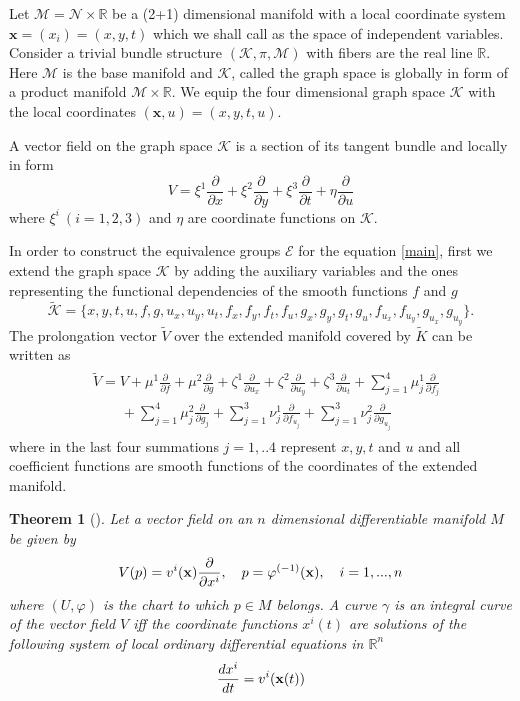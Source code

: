 \documentclass[a4paper]{article}
\newtheorem{theorem}{Theorem}
\def\bea{\begin{eqnarray}}
\def\eea{\end{eqnarray}}
\def\be{\begin{equation}}
\def\ee{\end{equation}}
\def\bs{\begin{split}}
\begin{document}
Let $\mathcal{M}=\mathcal{N}\times \mathbb R$  be a (2+1) dimensional manifold with a local coordinate system $\mathbf{x}=( x_{i}) =( x,y,t)$ which we shall call as the
space of independent variables. Consider a trivial bundle structure $(
\mathcal{K},\pi ,\mathcal{M}) $ with fibers are the real line $\mathbb{R}$. Here $\mathcal{M}$ is the base manifold and $\mathcal{K}$, called the
graph space is globally in form of a product manifold $\mathcal{M}\times \mathbb{R}$. We equip the four dimensional graph space $\mathcal{K}$ with
the local coordinates $( \mathbf{x},u) =( x,y,t,u) $.
\par
 A vector field on the graph space $\mathcal{K}$ is a section of its tangent
bundle and locally in form
 \be
V=\xi^1\frac{\partial}{\partial x}+\xi^2\frac{\partial}{\partial y}+\xi^3\frac{\partial}{\partial t}+\eta\frac{\partial}{\partial u}
\ee
 where $\xi^i\ (i=1,2,3)$ and $\eta$ are coordinate functions on $\mathcal{K}$.
\par
 In order to construct the equivalence groups $\mathcal{E}$ for the equation \eqref{main}, first we  extend the graph space $\mathcal{K}$  by adding the auxiliary variables and the ones representing the functional dependencies of the smooth functions $f$ and $g$
 \be
 \label{manifold}
 \tilde{\mathcal{K}}=\{x,y,t,u,f,g,u_x,u_y,u_t,f_x,f_y,f_t,f_u,g_x,g_y,g_t,g_u,f_{u_x},f_{u_y},g_{u_x},g_{u_y}\}.
 \ee
The prolongation vector $\tilde V$ over the extended manifold covered by $\tilde K$   can be written as
\bea \label{prolonged}\bs
 &\tilde{V} =V+\mu^1 \frac{\partial }{{\partial f }} +\mu^2  \frac{\partial }{{\partial g }} +\zeta^1
   \frac{\partial }{{\partial u_x }} +\zeta^2  \frac{\partial }{{\partial u_y   }}
   + \zeta^3\frac{\partial }{{\partial u_t }} + \sum_{j=1}^4\mu_j^1 \frac{\partial }
   {{\partial f_j }}  \\
 &\qquad+\sum_{j=1}^4\mu_j^2 \frac{\partial }
   {{\partial g_j }}+\sum_{j=1}^3\nu_j^1 \frac{\partial }
   {{\partial f_{u_j} }}+\sum_{j=1}^3\nu_j^2 \frac{\partial }
   {{\partial g_{u_j} }}
 \end{split}
\eea
where in the last four summations $j=1,..4$ represent $x,y,t$ and  $u$ and all coefficient functions are smooth functions of the coordinates of the extended manifold.  
\begin{theorem}[\cite{suhubi2013exterior}]
Let a vector field on an $n$ dimensional differentiable manifold $M$ be given by $$V(p)=v^i({\bf x})\frac{\partial}{\partial x^i}, \quad p=\varphi^{(-1)}({\bf x}),\quad i=1,...,n$$
where $(U,\varphi)$ is the chart to which $p\in M$ belongs. A curve $\gamma$ is an integral curve of the vector field $V$ iff the coordinate functions $x^i(t)$ are solutions of the following system of local ordinary differential equations in $\mathbb R^n$
$$
\frac{d x^i}{dt}=v^i({\bf x}(t))
$$
\end{theorem}
\end{document}
